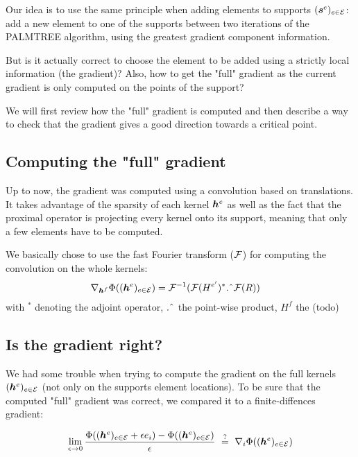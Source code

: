 Our idea is to use the same principle when adding elements to supports $(\bm{s}^e)_{e \in \mathcal E}$: add a new element to one of the supports between two iterations of the PALMTREE algorithm, using the greatest gradient component information.

But is it actually correct to choose the element to be added using a strictly local information (the gradient)? Also, how to get the "full" gradient as the current gradient is only computed on the points of the support?

We will first review how the "full" gradient is computed and then describe a way to check that the gradient gives a good direction towards a critical point.

\subsection{Computing the "full" gradient}
Up to now, the gradient was computed using a convolution based on translations. It takes advantage of the sparsity of each kernel $\bm{h}^e$ as well as the fact that the proximal operator is projecting every kernel onto its support, meaning that only a few elements have to be computed.

We basically chose to use the fast Fourier transform ($\mathcal F$) for computing the convolution on the whole kernels:
\begin{align*}
	\nabla_{\bm{h}^f} \Phi((\bm{h}^e)_{e \in \mathcal E})&= \mathcal F^{-1}(\mathcal F(H^{e'})^* \text{.\^{}} \mathcal F(R))
\end{align*}
with ${}^*$ denoting the adjoint operator, $\text{.\^{}}$ the point-wise product, $H^{f}$ the (todo) %

\subsection{Is the gradient right?}
We had some trouble when trying to compute the gradient on the full kernels $(\bm{h}^e)_{e \in \mathcal E}$ (not only on the supports element locations). To be sure that the computed "full" gradient was correct, we compared it to a finite-diffences gradient:

$$\lim_{\epsilon \rightarrow 0} \frac{\Phi((\bm{h}^e)_{e \in \mathcal E}+\epsilon e_i) - \Phi ((\bm{h}^e)_{e \in \mathcal E}) }{\epsilon} ~\overset{?}{=}~ \nabla_i \Phi ((\bm{h}^e)_{e \in \mathcal E})$$

